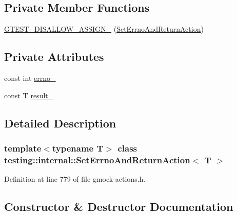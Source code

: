 \subsection*{Private Member Functions}
\begin{DoxyCompactItemize}
\item 
\hyperlink{classtesting_1_1internal_1_1SetErrnoAndReturnAction_a18906b36848b148a809907d105823ccc}{G\+T\+E\+S\+T\+\_\+\+D\+I\+S\+A\+L\+L\+O\+W\+\_\+\+A\+S\+S\+I\+G\+N\+\_\+} (\hyperlink{classtesting_1_1internal_1_1SetErrnoAndReturnAction}{Set\+Errno\+And\+Return\+Action})
\end{DoxyCompactItemize}
\subsection*{Private Attributes}
\begin{DoxyCompactItemize}
\item 
const int \hyperlink{classtesting_1_1internal_1_1SetErrnoAndReturnAction_ac4f5ce108de323f1f76654c38aa883a3}{errno\+\_\+}
\item 
const T \hyperlink{classtesting_1_1internal_1_1SetErrnoAndReturnAction_a271f5a3b41aa3a7f06fbd69ad19b1c77}{result\+\_\+}
\end{DoxyCompactItemize}


\subsection{Detailed Description}
\subsubsection*{template$<$typename T$>$\newline
class testing\+::internal\+::\+Set\+Errno\+And\+Return\+Action$<$ T $>$}



Definition at line 779 of file gmock-\/actions.\+h.



\subsection{Constructor \& Destructor Documentation}
\mbox{\label{classtesting_1_1internal_1_1SetErrnoAndReturnAction_abfe5a194a9b8f2b303c635ad99b3a257}} 
